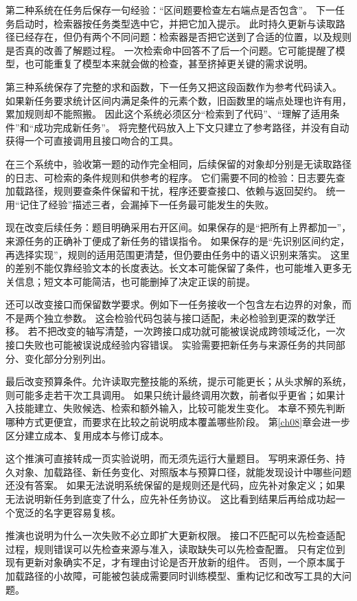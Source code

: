 第二种系统在任务后保存一句经验：``区间题要检查左右端点是否包含''。
下一任务启动时，检索器按任务类型选中它，并把它加入提示。
此时持久更新与读取路径已经存在，但仍有两个不同问题：检索器是否把它送到了合适的位置，以及规则是否真的改善了解题过程。
一次检索命中回答不了后一个问题。它可能提醒了模型，也可能重复了模型本来就会做的检查，甚至挤掉更关键的需求说明。

第三种系统保存了完整的求和函数，下一任务又把这段函数作为参考代码读入。
如果新任务要求统计区间内满足条件的元素个数，旧函数里的端点处理也许有用，累加规则却不能照搬。
因此这个系统必须区分``检索到了代码''、``理解了适用条件''和``成功完成新任务''。
将完整代码放入上下文只建立了参考路径，并没有自动获得一个可直接调用且接口吻合的工具。

在三个系统中，验收第一题的动作完全相同，后续保留的对象却分别是无读取路径的日志、可检索的条件规则和供参考的程序。
它们需要不同的检验：日志要先查加载路径，规则要查条件保留和干扰，程序还要查接口、依赖与返回契约。
统一用``记住了经验''描述三者，会漏掉下一任务最可能发生的失败。

现在改变后续任务：题目明确采用右开区间。如果保存的是``把所有上界都加一''，来源任务的正确补丁便成了新任务的错误指令。
如果保存的是``先识别区间约定，再选择实现''，规则的适用范围更清楚，但仍要由任务中的语义识别来落实。
这里的差别不能仅靠经验文本的长度表达。长文本可能保留了条件，也可能堆入更多无关信息；短文本可能简洁，也可能删掉了决定正误的前提。

还可以改变接口而保留数学要求。例如下一任务接收一个包含左右边界的对象，而不是两个独立参数。
这会检验代码包装与接口适配，未必检验到更深的数学迁移。
若不把改变的轴写清楚，一次跨接口成功就可能被误说成跨领域泛化，一次接口失败也可能被误说成经验内容错误。
实验需要把新任务与来源任务的共同部分、变化部分分别列出。

最后改变预算条件。允许读取完整技能的系统，提示可能更长；从头求解的系统，则可能多走若干次工具调用。
如果只统计最终调用次数，前者似乎更省；如果计入技能建立、失败候选、检索和额外输入，比较可能发生变化。
本章不预先判断哪种方式更便宜，而要求在比较之前说明成本覆盖哪些阶段。
第\ref{ch08}章会进一步区分建立成本、复用成本与修订成本。

这个推演可直接转成一页实验说明，而无须先运行大量题目。
写明来源任务、持久对象、加载路径、新任务变化、对照版本与预算口径，就能发现设计中哪些问题还没有答案。
如果无法说明系统保留的是规则还是代码，应先补对象定义；如果无法说明新任务到底变了什么，应先补任务协议。
这比看到结果后再给成功起一个宽泛的名字更容易复核。

推演也说明为什么一次失败不必立即扩大更新权限。
接口不匹配可以先检查适配过程，规则错误可以先检查来源与准入，读取缺失可以先检查配置。
只有定位到现有更新对象确实不足，才有理由讨论是否开放新的组件。
否则，一个原本属于加载路径的小故障，可能被包装成需要同时训练模型、重构记忆和改写工具的大问题。


